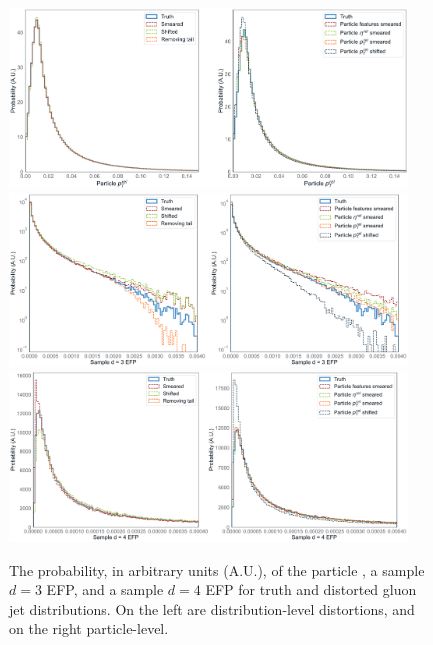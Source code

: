 \begin{figure}[htpb]
    \includegraphics[width=0.94\textwidth]{figures/04-ML4Sim/evaluating/jet_partpt_dists.pdf}
    \includegraphics[width=0.94\textwidth]{figures/04-ML4Sim/evaluating/jet_efp12_dists.pdf}
    \includegraphics[width=0.94\textwidth]{figures/04-ML4Sim/evaluating/jet_efp25_dists.pdf}
    \caption{The probability, in arbitrary units (A.U.), of the particle \ptrel, a sample $d=3$ EFP, and a sample $d=4$ EFP for truth and distorted gluon jet distributions. 
    On the left are distribution-level distortions, and on the right particle-level.}
    \label{fig:04_evaluating_jet_dists_app}
\end{figure}